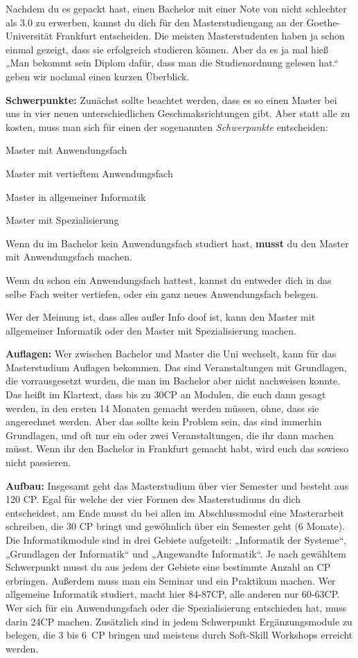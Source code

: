 \spaltenanfang
Nachdem du es gepackt hast, einen Bachelor mit einer Note von nicht schlechter als 3.0 zu erwerben, kannst du dich für den Masterstudiengang an der Goethe-Universität Frankfurt entscheiden.
Die meisten Masterstudenten haben ja schon einmal gezeigt, dass sie
erfolgreich studieren k\"onnen. Aber da es ja mal hie{\ss} „Man bekommt sein Diplom
daf\"ur, dass man die Studienordnung gelesen hat.“ geben wir nochmal einen
kurzen \"Uberblick.

\textbf{Schwerpunkte:}
Zun\"achst sollte beachtet werden, dass es so einen Master bei uns in vier neuen unterschiedlichen Geschmaksrichtungen gibt. Aber statt alle zu kosten, muss man sich f\"ur einen der sogenannten \emph{Schwerpunkte} entscheiden:
\begin{noindEnumerate}
\item Master mit Anwendungsfach
\item Master mit vertieftem Anwendungsfach
\item Master in allgemeiner Informatik
\item Master mit Spezialisierung
\end{noindEnumerate}

Wenn du im Bachelor kein Anwendungsfach studiert hast, \textbf{musst} du den Master mit Anwendungsfach machen.

Wenn du schon ein Anwendungsfach hattest, kannst du entweder dich in das selbe Fach weiter vertiefen, oder ein ganz neues Anwendungsfach belegen.

Wer der Meinung ist, dass alles au{\ss}er Info doof ist, kann den Master mit allgemeiner Informatik oder den Master mit Spezialisierung machen. 

\textbf{Auflagen:}
Wer zwischen Bachelor und Master die Uni wechselt, kann f\"ur das Masterstudium Auflagen bekommen.
Das sind Veranstaltungen mit Grundlagen, die vorrausgesetzt wurden, die man im Bachelor aber nicht nachweisen konnte.
Das hei{\ss}t im Klartext, dass bis zu 30CP an Modulen, die euch dann gesagt werden, in den ersten 14 Monaten gemacht werden m\"ussen, ohne, dass sie angerechnet werden. Aber das sollte kein Problem sein, das sind immerhin Grundlagen, und oft nur ein oder zwei Veranstaltungen, die ihr dann machen m\"usst. Wenn ihr den Bachelor in Frankfurt gemacht habt, wird euch das sowieso nicht passieren.

\textbf{Aufbau:}
Insgesamt geht das Masterstudium über vier Semester und besteht aus 120 CP.
Egal für welche der vier Formen des Masterstudiums du dich entscheidest, am Ende musst du bei allen im Abschlussmodul eine Masterarbeit schreiben, die 30 CP bringt und gewöhnlich über ein Semester geht (6 Monate).
Die Informatikmodule sind in drei Gebiete aufgeteilt: „Informatik der Systeme“, „Grundlagen der Informatik“ und „Angewandte Informatik“. Je nach gewähltem Schwerpunkt musst du aus jedem der Gebiete eine bestimmte Anzahl an CP erbringen. Au{\ss}erdem muss man ein Seminar und ein Praktikum machen. Wer allgemeine Informatik studiert, macht hier 84-87CP, alle anderen nur 60-63CP.
Wer sich f\"ur ein Anwendungsfach oder die Spezialisierung entschieden hat, muss darin 24CP machen.
Zusätzlich sind in jedem Schwerpunkt Ergänzungsmodule zu belegen, die 3 bis 6~CP bringen und meistens durch Soft-Skill Workshops erreicht werden.

